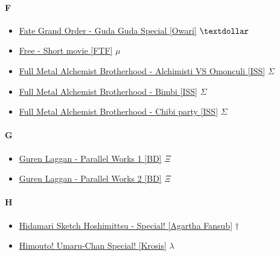 		\paragraph{F} \hypertarget{SPF}{}
			\begin{itemize}
				
				\item  \href{https://mega.nz/#!v7Z0RYjZ!fJq7F62EIfnq6igZuKCFrI8uHtdHWzRQUjxIQBzQfuE} {Fate Grand Order - Guda Guda Special [Owari]} $\textdollar$   \\ 
				\item  \href{https://mega.nz/#F!o14FiTyL!WfIvFaTRQdpPk0B55VOGIQ} {Free - Short movie [FTF]} $\mu$   \\ 
				\item  \href{https://mega.nz/#F!k2BzADzK!gco5XHqkWeze2e2JZPDvRw} {Full Metal Alchemist Brotherhood - Alchimisti VS Omonculi [ISS]} $\Sigma$   \\ 
				\item  \href{https://mega.nz/#F!Ri5y1ZKb!Zb6BYfPal7SfKJ7dnEasWA} {Full Metal Alchemist Brotherhood - Bimbi [ISS]} $\Sigma$   \\ 
				\item  \href{https://mega.nz/#F!8zISAKAA!nPtH5ybLGqNzvVjo-pRj1A} {Full Metal Alchemist Brotherhood - Chibi party [ISS]} $\Sigma$   \\
				
				 
			
			\end{itemize}
			
		\paragraph{G} \hypertarget{SPG}{}
			\begin{itemize}
				
				\item  \href{https://mega.nz/#!JGQSTDhS!kC2EUgaA5xlPa3Z49BbK2TnZeiX16CIk8WEi3lkRtaw} {Guren Laggan - Parallel Works 1 [BD]} $\Xi$   \\ 
				\item  \href{https://mega.nz/#!Yb4CCBoB!A2GcTxlGiPhXQ93Pz4idb4XG5cBYV2H5hvLIyQvHIug} {Guren Laggan - Parallel Works 2 [BD]} $\Xi$   \\ 
				
			\end{itemize}
			
		\paragraph{H} \hypertarget{SPH}{}
			\begin{itemize}
			
				\item  \href{https://mega.nz/#F!SaJzlIba!jhrPS9W9w6445U1i6Vg_pQ} {Hidamari Sketch Hoshimittsu - Special! [Agartha Fansub]} $\dag$   \\ 
				\item  \href{https://mega.nz/#F!TkwwXBqb!aUzrKfLPcXk0M_l-aTkNng} {Himouto! Umaru-Chan Special! [Krosis]} $\lambda$   \\ 
			
			\end{itemize}		
			
